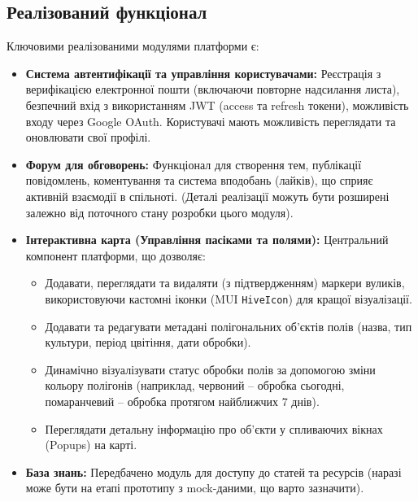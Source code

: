 \subsection*{Реалізований функціонал}
Ключовими реалізованими модулями платформи є:
\begin{itemize}
    \item \textbf{Система автентифікації та управління користувачами:} Реєстрація з верифікацією електронної пошти (включаючи повторне надсилання листа), безпечний вхід з використанням JWT (access та refresh токени), можливість входу через Google OAuth. Користувачі мають можливість переглядати та оновлювати свої профілі.
    \item \textbf{Форум для обговорень:} Функціонал для створення тем, публікації повідомлень, коментування та система вподобань (лайків), що сприяє активній взаємодії в спільноті. (Деталі реалізації можуть бути розширені залежно від поточного стану розробки цього модуля).
    \item \textbf{Інтерактивна карта (Управління пасіками та полями):} Центральний компонент платформи, що дозволяє:
        \begin{itemize}
            \item Додавати, переглядати та видаляти (з підтвердженням) маркери вуликів, використовуючи кастомні іконки (MUI \texttt{HiveIcon}) для кращої візуалізації.
            \item Додавати та редагувати метадані полігональних об'єктів полів (назва, тип культури, період цвітіння, дати обробки).
            \item Динамічно візуалізувати статус обробки полів за допомогою зміни кольору полігонів (наприклад, червоний – обробка сьогодні, помаранчевий – обробка протягом найближчих 7 днів).
            \item Переглядати детальну інформацію про об'єкти у спливаючих вікнах (Popups) на карті.
        \end{itemize}
    \item \textbf{База знань:} Передбачено модуль для доступу до статей та ресурсів (наразі може бути на етапі прототипу з mock-даними, що варто зазначити).
\end{itemize}

